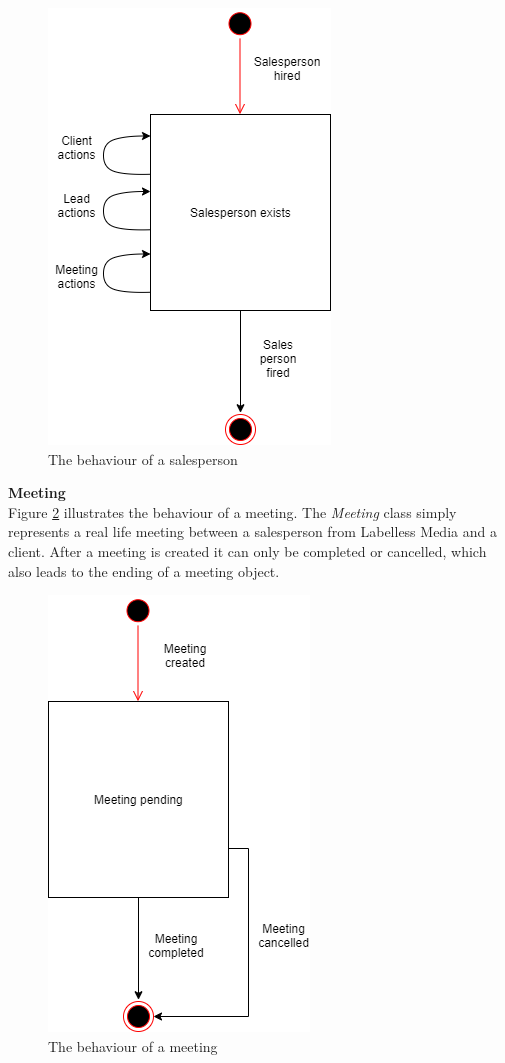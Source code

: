 \begin{figure}[H]
    \centering
    \includegraphics[scale=0.8, clip]{figures/Behaviors/BehaviorSalesPerson.png}
    \caption{The behaviour of a salesperson }
    \label{fig:behaviourSalesperson}
\end{figure}

\noindent
\textbf{Meeting}
\\
Figure \ref{fig:behaviourMeeting} illustrates the behaviour of a meeting. The \textit{Meeting} class simply represents a real life meeting between a salesperson from Labelless Media and a client. After a meeting is created it can only be completed or cancelled, which also leads to the ending of a meeting object. 
\begin{figure}[H]
    \centering
    \includegraphics[scale=0.9, clip]{figures/Behaviors/BehaviorMeeting.png}
    \caption{The behaviour of a meeting }
    \label{fig:behaviourMeeting}
\end{figure}
\noindent



